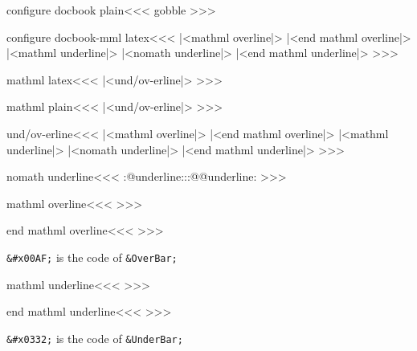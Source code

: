 \<configure docbook plain\><<<
   {\hbox\bgroup \:gobble}
   {\egroup {}}
   {}
   {}
>>>







\<configure docbook-mml latex\><<<
   {\bgroup\ifmathml |<mathml overline|>\else
         \fi}
   {\ifmathml |<end mathml overline|>\else {}\fi\egroup}
   {\bgroup
    \ifmathml |<mathml underline|>%
    \else |<nomath underline|>\fi}
   {\ifmathml |<end mathml underline|>\else {}\fi \egroup}
>>>


\<mathml latex\><<<
|<und/ov-erline|>
>>>

\<mathml plain\><<<
|<und/ov-erline|>
>>>


\<und/ov-erline\><<<
   {\bgroup |<mathml overline|>}
   {|<end mathml overline|>\egroup}
   {\bgroup \ifmmode |<mathml underline|>\else 
     |<nomath underline|>\fi}
   {|<end mathml underline|>\egroup}
>>>

\<nomath underline\><<<
\expandafter\everymath
\expandafter{\expandafter\everymath
             \expandafter{\the\everymath}}%
\let\o::@underline:\o:@@underline:
\def\o:@@underline:{\let\o:@@underline:\o::@underline:}%
>>>


\<mathml overline\><<<
%
>>>

\<end mathml overline\><<<
%
>>>

\verb'&#x00AF;' is the code of \verb'&OverBar;'


\<mathml underline\><<<
% 
>>>

\<end mathml underline\><<<
%
>>>


\verb'&#x0332;' is the code of \verb'&UnderBar;'



